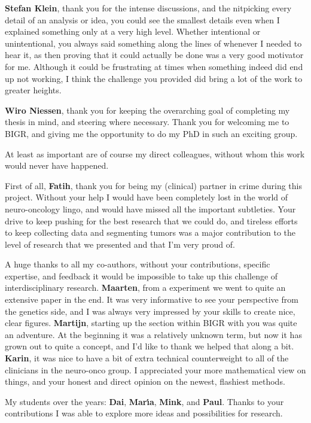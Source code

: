 \textbf{Stefan Klein}, thank you for the intense discussions, and the nitpicking every detail of an analysis or idea, you could see the smallest details even when I explained something only at a very high level.
Whether intentional or unintentional, you always said something along the lines of  whenever I needed to hear it, as then proving that it could actually be done was a very good motivator for me.
Although it could be frustrating at times when something indeed did end up not working, I think the challenge you provided did bring a lot of the work to greater heights.

\textbf{Wiro Niessen}, thank you for keeping the overarching goal of completing my thesis in mind, and steering where necessary.
Thank you for welcoming me to BIGR, and giving me the opportunity to do my PhD in such an exciting group.

At least as important are of course my direct colleagues, without whom this work would never have happened.

First of all, \textbf{Fatih}, thank you for being my (clinical) partner in crime during this project.
Without your help I would have been completely lost in the world of neuro-oncology lingo, and would have missed all the important subtleties.
Your drive to keep pushing for the best research that we could do, and tireless efforts to keep collecting data and segmenting tumors was a major contribution to the level of research that we presented and that I'm very proud of.

A huge thanks to all my co-authors, without your contributions, specific expertise, and feedback it would be impossible to take up this challenge of interdisciplinary research.
\textbf{Maarten}, from a  experiment we went to quite an extensive paper in the end.
It was very informative to see your perspective from the genetics side, and I was always very impressed by your skills to create nice, clear figures.
\textbf{Martijn}, starting up the  section within BIGR with you was quite an adventure.
At the beginning it was a relatively unknown term, but now it has grown out to quite a concept, and I'd like to thank we helped that along a bit.
\textbf{Karin}, it was nice to have a bit of extra technical counterweight to all of the clinicians in the neuro-onco group.
I appreciated your more mathematical view on things, and your honest and direct opinion on the newest, flashiest methods.

My students over the years: \textbf{Dai}, \textbf{Mar{\'\i}a}, \textbf{Mink}, and \textbf{Paul}.
Thanks to your contributions I was able to explore more ideas and possibilities for research.


